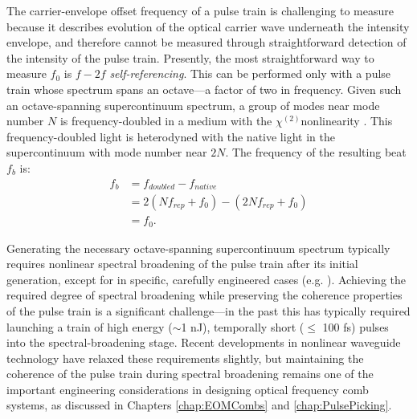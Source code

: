 The carrier-envelope offset frequency of a pulse train is challenging to measure because it describes evolution of the optical carrier wave underneath the intensity envelope, and therefore cannot be measured through straightforward detection of the intensity of the pulse train. Presently, the most straightforward way to measure $f_0$ is $f-2f$ \textit{self-referencing}. This can be performed only with a pulse train whose spectrum spans an octave---a factor of two in frequency. Given such an octave-spanning supercontinuum spectrum, a group of modes near mode number $N$ is frequency-doubled in a medium with the $\chi^{(2)}$nonlinearity \cite{Boyd2003}. This frequency-doubled light is heterodyned with the native light in the supercontinuum with mode number near $2N$. The frequency of the resulting beat $f_b$ is:
\begin{align}
f_b&=f_{doubled}-f_{native}\\
&=2(Nf_{rep}+f_0)-(2Nf_{rep}+f_0)\\
&=f_0.
\end{align}

Generating the necessary octave-spanning supercontinuum spectrum typically requires nonlinear spectral broadening of the pulse train after its initial generation, except for in specific, carefully engineered cases (e.g. \cite{Fortier2003}). Achieving the required degree of spectral broadening while preserving the coherence properties of the pulse train is a significant challenge---in the past this has typically required launching a train of high energy ($\sim$1 nJ), temporally short ($\leq$ 100 fs) pulses into the spectral-broadening stage. Recent developments in nonlinear waveguide technology have relaxed these requirements slightly, but maintaining the coherence of the pulse train during spectral broadening remains one of the important engineering considerations in designing optical frequency comb systems, as discussed in Chapters \ref{chap:EOMCombs} and \ref{chap:PulsePicking}. 


